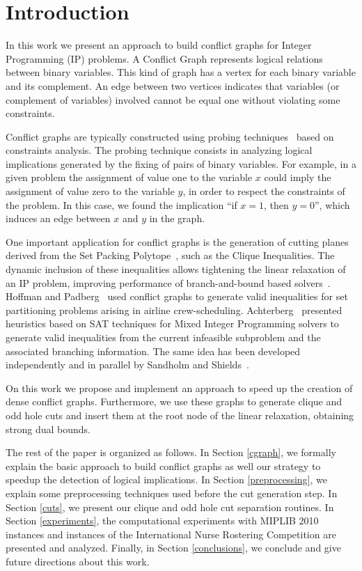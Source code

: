 \documentclass[preprint,12pt]{elsarticle}
\begin{document}

\section{Introduction}

In this work we present an approach to build conflict graphs for Integer Programming (IP) problems. A Conflict Graph represents logical relations between binary variables. This kind of graph has a vertex for each binary variable and its complement. An edge between two vertices indicates that variables (or complement of variables) involved cannot be equal one without violating some constraints.

Conflict graphs are typically constructed using probing techniques~\cite{Borndorfer1998} based on constraints analysis. The probing technique consists in analyzing logical implications generated by the fixing of pairs of binary variables. For example, in a given problem the assignment of value one to the variable $x$ could imply the assignment of value zero to the variable $y$, in order to respect the constraints of the problem. In this case, we found the implication ``if $x = 1$, then $y = 0$'', which induces an edge between $x$ and $y$ in the graph.

One important application for conflict graphs is the generation of cutting planes derived from the Set Packing Polytope~\cite{Padberg1973}, such as the Clique Inequalities. The dynamic inclusion of these inequalities allows tightening the linear relaxation of an IP problem, improving performance of branch-and-bound based solvers~\cite{atamturk}. Hoffman and Padberg~\cite{hoffman} used conflict graphs to generate valid inequalities for set partitioning problems arising in airline crew-scheduling. Achterberg~\cite{achterberg} presented heuristics based on SAT techniques for Mixed Integer Programming solvers to generate valid inequalities from the current infeasible subproblem and the associated branching information. The same idea has been developed independently and in parallel by Sandholm and Shields~\cite{sandholm}.  

On this work we propose and implement an approach to speed up the creation of dense conflict graphs. Furthermore, we use these graphs to generate clique and odd hole cuts and insert them at the root node of the linear relaxation, obtaining strong dual bounds.

The rest of the paper is organized as follows. In Section \ref{cgraph}, we formally explain the basic approach to build conflict graphs as well our strategy to speedup the detection of logical implications. In Section \ref{preprocessing}, we explain some preprocessing techniques used before the cut generation step. In Section \ref{cuts}, we present our clique and odd hole cut separation routines. In Section \ref{experiments}, the computational experiments with MIPLIB 2010 instances \cite{miplib} and instances of the International Nurse Rostering Competition \cite{haspeslagh} are presented and analyzed. Finally, in Section \ref{conclusions}, we conclude and give future directions about this work.
\end{document}

